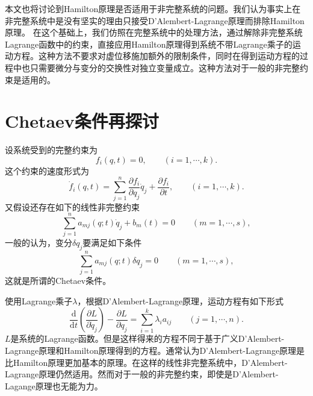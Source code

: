 \documentclass[a4paper,UTF8,11pt,hyperref]{ctexart}
\newcommand{\mathd}{\mathrm{d}}
\begin{document}

本文也将讨论到Hamilton原理是否适用于非完整系统的问题。我们认为事实上在非完整系统中是没有坚实的理由只接受D'Alembert-Lagrange原理而排除Hamilton原理。
在这个基础上，我们仿照在完整系统中的处理方法，通过解除非完整系统Lagrange函数中的约束，直接应用Hamilton原理得到系统不带Lagrange乘子的运动方程。这种方法不要求对虚位移施加额外的限制条件，同时在得到运动方程的过程中也只需要微分与变分的交换性对独立变量成立。这种方法对于一般的非完整约束是适用的。


\section{Chetaev条件再探讨}
设系统受到的完整约束为
\begin{equation}
  f_i  ( q, t) = 0 , \hspace{2em} ( i = 1, \cdots , k).
  \label{eq:hc}
\end{equation}
这个约束的速度形式为
\begin{equation}
\dot{f}_i ( q, t) = \sum^n_{j = 1} \frac{\partial f_i}{\partial q_j}
   \dot{q}_j + \frac{\partial f_i}{\partial t}, \hspace{2em} ( i = 1, \cdots,
   k) .\label{eq:hcv}
\end{equation}
又假设还存在如下的线性非完整约束
\begin{equation}
  \sum_{j = 1}^n a_{m j} ( q ; t) \dot{q}_j + b_m ( t) = 0 \hspace{2em} ( m =
  1, \cdots, s), \label{eq:nhc}
\end{equation}
一般的认为，变分$\delta q_j$要满足如下条件
\begin{equation}\label{chetaev}
  \sum_{j = 1}^n a_{m j} ( q ; t) \delta q_j = 0 \hspace{2em} ( m = 1,
   \cdots, s),
\end{equation}
这就是所谓的Chetaev条件。

使用Lagrange乘子$\lambda$，根据D'Alembert-Lagrange原理，运动方程有如下形式
\begin{equation}\label{linearnheom}
  \frac{\mathd}{\mathd t} \left( \frac{\partial L}{\partial \dot{q}_j}
   \right) - \frac{\partial L}{\partial q_j} = \sum_{i = 1}^k \lambda_i a_{i
   j} \hspace{2em} ( j = 1, \cdots, n) .
\end{equation}
$L$是系统的Lagrange函数。但是这样得来的方程不同于基于广义D'Alembert-Lagrange原理和Hamilton原理得到的方程\supercite{cronstrom2009}。通常认为D'Alembert-Lagrange原理是比Hamilton原理更加基本的原理。在这样的线性非完整系统中，D'Alembert-Lagrange原理仍然适用。然而对于一般的非完整约束，即使是D'Alembert-Lagange原理也无能为力\supercite{flannery2005}。
\end{document}
